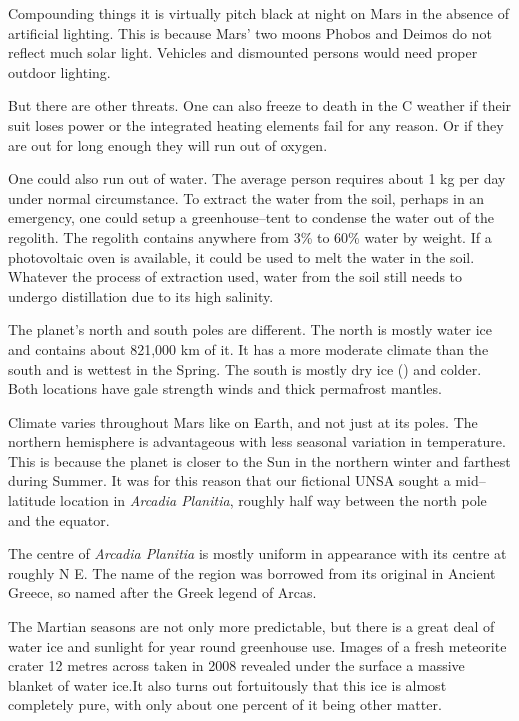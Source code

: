 Compounding things it is virtually pitch black at night on Mars in the absence of artificial lighting. This is because Mars' two moons Phobos and Deimos do not reflect much solar light. Vehicles and dismounted persons would need proper outdoor lighting.

But there are other threats. One can also freeze to death in the C weather if their suit loses power or the integrated heating elements fail for any reason. Or if they are out for long enough they will run out of oxygen.

One could also run out of water. The average person requires about 1 kg per day under normal circumstance. To extract the water from the soil, perhaps in an emergency, one could setup a greenhouse--tent to condense the water out of the regolith. The regolith contains anywhere from 3\% to 60\% water by weight. If a photovoltaic oven is available, it could be used to melt the water in the soil. Whatever the process of extraction used, water from the soil still needs to undergo distillation due to its high salinity.


The planet's north and south poles are different. The north is mostly water ice and contains about 821,000 km of it. It has a more moderate climate than the south and is wettest in the Spring. The south is mostly dry ice () and colder. Both locations have gale strength winds and thick permafrost mantles.

Climate varies throughout Mars like on Earth, and not just at its poles. The northern hemisphere is advantageous with less seasonal variation in temperature. This is because the planet is closer to the Sun in the northern winter and farthest during Summer. It was for this reason that our fictional UNSA sought a mid--latitude location in {\it Arcadia Planitia}, roughly half way between the north pole and the equator. 

The centre of {\it Arcadia Planitia} is mostly uniform in appearance with its centre at roughly N E. The name of the region was borrowed from its original in Ancient Greece, so named after the Greek legend of Arcas.

The Martian seasons are not only more predictable, but there is a great deal of water ice and sunlight for year round greenhouse use. Images of a fresh meteorite crater 12 metres across taken in 2008 revealed under the surface a massive blanket of water ice. It also turns out fortuitously that this ice is almost completely pure, with only about one percent of it being other matter.

